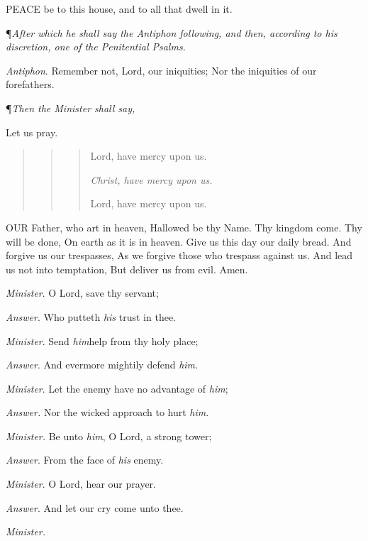 PEACE be to this house,
and to all that dwell in it.

¶\emph{After which he shall say the Antiphon following, and then, according
to his discretion, one of the Penitential Psalms.}

\emph{Antiphon}. Remember not,
Lord, our iniquities; Nor the iniquities of our forefathers.

¶\emph{Then the Minister shall say,}

Let us pray.

\begin{quote}

\begin{quote}

\begin{quote}

Lord,
have mercy upon us. 

\emph{Christ, have mercy upon us.}

Lord, have mercy upon us.

\end{quote}

\end{quote}

\end{quote}

OUR
Father, who art in heaven, Hallowed be thy Name. Thy kingdom come. Thy
will be done, On earth as it is in heaven. Give us this day our daily
bread. And forgive us our trespasses, As we forgive those who trespass
against us. And lead us not into temptation, But deliver us from evil.
Amen.

\emph{Minister}. O Lord, save thy
servant; 

\emph{Answer}. Who putteth \emph{his} trust in
thee. 

\emph{Minister}. Send \emph{him}help from thy
holy place; 

\emph{Answer}. And evermore mightily defend \emph{him.}

\emph{Minister}. Let the enemy have no advantage
of \emph{him};

\emph{Answer.} Nor the wicked approach to hurt \emph{him}.

\emph{Minister.} Be unto \emph{him}, O Lord, a
strong tower; 

\emph{Answer}. From the face of \emph{his} enemy.

\emph{Minister}. O Lord, hear our prayer.

\emph{Answer}. And let our cry come unto thee.

\emph{Minister.}

